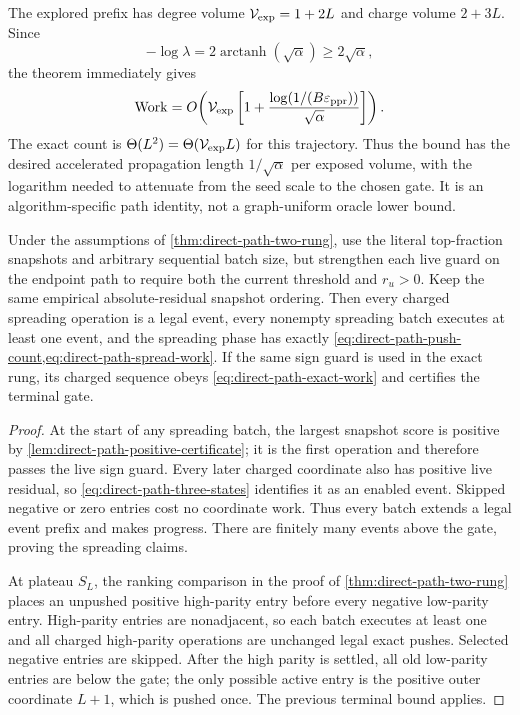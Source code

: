 The explored prefix has degree volume
$\mathcal V_{\rm exp}=1+2L$ and charge volume $2+3L$. Since
\begin{equation}
 -\log\lambda=2\operatorname{arctanh}(\sqrt\alpha)
 \geq2\sqrt\alpha,
 \label{eq:direct-path-log-lambda}
\end{equation}
the theorem immediately gives
\begin{equation}
 \operatorname{Work}
 =O\!\left(\mathcal V_{\rm exp}
 \left[1+\frac{\log(1/(B\varepsilon_{\mathrm{ppr}}))}{\sqrt\alpha}\right]\right).
 \label{eq:direct-path-explored-volume-bound}
\end{equation}
The exact count is $\Theta(L^2)=\Theta(\mathcal V_{\rm exp}L)$ for this
trajectory. Thus the bound has the desired accelerated propagation length
$1/\sqrt\alpha$ per exposed volume, with the logarithm needed to attenuate
from the seed scale to the chosen gate. It is an algorithm-specific path
identity, not a graph-uniform oracle lower bound.

\begin{corollary}
\label{cor:direct-path-sign-guarded-batches}
Under the assumptions of \cref{thm:direct-path-two-rung}, use the literal
top-fraction snapshots and arbitrary sequential batch size,
but strengthen each live guard on the endpoint path to require both the
current threshold and $r_u>0$. Keep the same empirical absolute-residual
snapshot ordering. Then every charged spreading operation is a legal event,
every nonempty spreading batch executes at least one event, and the spreading
phase has exactly \cref{eq:direct-path-push-count,eq:direct-path-spread-work}.
If the same sign guard is used in the exact rung, its charged sequence obeys
\cref{eq:direct-path-exact-work} and certifies the terminal gate.
\end{corollary}

\begin{proof}
At the start of any spreading batch, the largest snapshot score is positive
by \cref{lem:direct-path-positive-certificate}; it is the first operation and
therefore passes the live sign guard. Every later charged coordinate also has
positive live residual, so \cref{eq:direct-path-three-states} identifies it
as an enabled event. Skipped negative or zero entries cost no coordinate work.
Thus every batch extends a legal event prefix and makes progress. There are
finitely many events above the gate, proving the spreading claims.

At plateau $S_L$, the ranking comparison in the proof of
\cref{thm:direct-path-two-rung} places an unpushed positive high-parity entry
before every negative low-parity entry. High-parity entries are nonadjacent,
so each batch executes at least one and all charged high-parity operations are
unchanged legal exact pushes. Selected negative entries are skipped. After
the high parity is settled, all old low-parity entries are below the gate;
the only possible active entry is the positive outer coordinate $L+1$, which
is pushed once. The previous terminal bound applies.
\end{proof}

